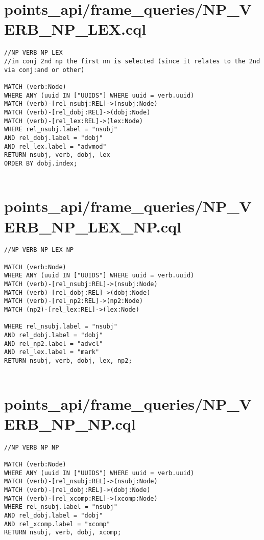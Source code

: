 \documentclass{article}
\begin{document}
\section*{points\_api/frame\_queries/NP\_VERB\_NP\_LEX.cql}
\begin{verbatim}
//NP VERB NP LEX
//in conj 2nd np the first nn is selected (since it relates to the 2nd via conj:and or other)

MATCH (verb:Node)
WHERE ANY (uuid IN ["UUIDS"] WHERE uuid = verb.uuid)
MATCH (verb)-[rel_nsubj:REL]->(nsubj:Node)
MATCH (verb)-[rel_dobj:REL]->(dobj:Node)
MATCH (verb)-[rel_lex:REL]->(lex:Node)
WHERE rel_nsubj.label = "nsubj"
AND rel_dobj.label = "dobj"
AND rel_lex.label = "advmod"
RETURN nsubj, verb, dobj, lex
ORDER BY dobj.index;


\end{verbatim}
\pagebreak

\section*{points\_api/frame\_queries/NP\_VERB\_NP\_LEX\_NP.cql}
\begin{verbatim}
//NP VERB NP LEX NP

MATCH (verb:Node)
WHERE ANY (uuid IN ["UUIDS"] WHERE uuid = verb.uuid)
MATCH (verb)-[rel_nsubj:REL]->(nsubj:Node)
MATCH (verb)-[rel_dobj:REL]->(dobj:Node)
MATCH (verb)-[rel_np2:REL]->(np2:Node)
MATCH (np2)-[rel_lex:REL]->(lex:Node)

WHERE rel_nsubj.label = "nsubj"
AND rel_dobj.label = "dobj"
AND rel_np2.label = "advcl"
AND rel_lex.label = "mark"
RETURN nsubj, verb, dobj, lex, np2;


\end{verbatim}
\pagebreak

\section*{points\_api/frame\_queries/NP\_VERB\_NP\_NP.cql}
\begin{verbatim}
//NP VERB NP NP

MATCH (verb:Node)
WHERE ANY (uuid IN ["UUIDS"] WHERE uuid = verb.uuid)
MATCH (verb)-[rel_nsubj:REL]->(nsubj:Node)
MATCH (verb)-[rel_dobj:REL]->(dobj:Node)
MATCH (verb)-[rel_xcomp:REL]->(xcomp:Node)
WHERE rel_nsubj.label = "nsubj"
AND rel_dobj.label = "dobj"
AND rel_xcomp.label = "xcomp"
RETURN nsubj, verb, dobj, xcomp;


\end{verbatim}
\pagebreak
\end{document}
